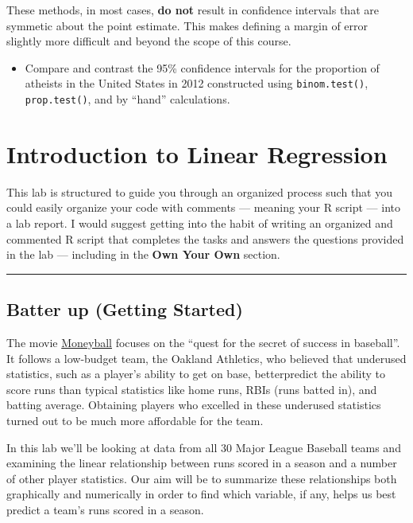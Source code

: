 \documentclass[]{book}
\providecommand{\tightlist}{%
  \setlength{\itemsep}{0pt}\setlength{\parskip}{0pt}}
\theoremstyle{definition}
\theoremstyle{definition}
\theoremstyle{definition}
\theoremstyle{remark}
\begin{document}
These methods, in most cases, \textbf{do not} result in confidence
intervals that are symmetic about the point estimate. This makes
defining a margin of error slightly more difficult and beyond the scope
of this course.

\begin{itemize}
\tightlist
\item
  Compare and contrast the 95\% confidence intervals for the proportion
  of atheists in the United States in 2012 constructed using
  \texttt{binom.test()}, \texttt{prop.test()}, and by ``hand''
  calculations.
\end{itemize}

\hypertarget{introduction-to-linear-regression}{%
\chapter{Introduction to Linear
Regression}\label{introduction-to-linear-regression}}

This lab is structured to guide you through an organized process such
that you could easily organize your code with comments --- meaning your
R script --- into a lab report. I would suggest getting into the habit
of writing an organized and commented R script that completes the tasks
and answers the questions provided in the lab --- including in the
\textbf{Own Your Own} section.

\begin{center}\rule{0.5\linewidth}{\linethickness}\end{center}

\hypertarget{batter-up-getting-started}{%
\section{Batter up (Getting Started)}\label{batter-up-getting-started}}

The movie
\href{http://en.wikipedia.org/wiki/Moneyball_(film)}{Moneyball} focuses
on the ``quest for the secret of success in baseball''. It follows a
low-budget team, the Oakland Athletics, who believed that underused
statistics, such as a player's ability to get on base, betterpredict the
ability to score runs than typical statistics like home runs, RBIs (runs
batted in), and batting average. Obtaining players who excelled in these
underused statistics turned out to be much more affordable for the team.

In this lab we'll be looking at data from all 30 Major League Baseball
teams and examining the linear relationship between runs scored in a
season and a number of other player statistics. Our aim will be to
summarize these relationships both graphically and numerically in order
to find which variable, if any, helps us best predict a team's runs
scored in a season.
\end{document}
